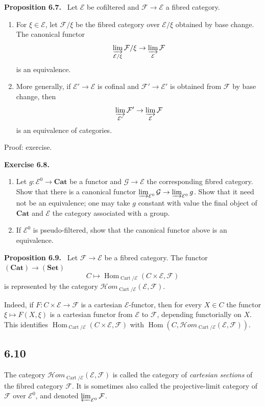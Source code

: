 \documentclass[11pt]{article}
\newcommand{\E}{\mathcal{E}}
\newcommand{\F}{\mathcal{F}}
\newcommand{\G}{\mathcal{G}}
\newcommand{\Ens}{\mathbf{Set}}
\newcommand{\Cat}{\mathbf{Cat}}
\newcommand{\Hom}{\operatorname{Hom}}
\newcommand{\Cart}{\operatorname{Cart}}
\newenvironment{statement}[1]{\par\medskip\noindent\textbf{#1.}\ }{\par\medskip}
\newenvironment{remarktext}[1]{\par\medskip\noindent\textbf{#1.}\ }{\par\medskip}
\begin{document}
\begin{statement}{Proposition 6.7}
Let \(\E\) be cofiltered and \(\F\to\E\) a fibred category.
\begin{enumerate}[label=\arabic*)]
\item For \(\xi\in\E\), let \(\F/\xi\) be the fibred category over \(\E/\xi\) obtained by base change. The canonical functor
\[
 \varinjlim_{\E/\xi}\F/\xi\to\varinjlim_{\E}\F
\]
is an equivalence.
\item More generally, if \(\E'\to\E\) is cofinal and \(\F'\to\E'\) is obtained from \(\F\) by base change, then
\[
 \varinjlim_{\E'}\F'\to\varinjlim_{\E}\F
\]
is an equivalence of categories.
\end{enumerate}
\end{statement}

Proof: exercise.

\begin{remarktext}{Exercise 6.8}
\begin{enumerate}[label=\arabic*)]
\item Let \(g:\E^0\to\Cat\) be a functor and \(\G\to\E\) the corresponding fibred category. Show that there is a canonical functor \(\varinjlim_{\E^0}\G\to\varinjlim_{\E^0}g\). Show that it need not be an equivalence; one may take \(g\) constant with value the final object of \(\Cat\) and \(\E\) the category associated with a group.
\item If \(\E^0\) is pseudo-filtered, show that the canonical functor above is an equivalence.
\end{enumerate}
\end{remarktext}

\begin{statement}{Proposition 6.9}
Let \(\F\to\E\) be a fibred category. The functor \((\Cat)\to(\Ens)\)
\[
 C\longmapsto \Hom_{\Cart/\E}(C\times\E,\F)
\]
is represented by the category \(\mathcal{H}om_{\Cart/\E}(\E,\F)\).
\end{statement}

Indeed, if \(F:C\times\E\to\F\) is a cartesian \(\E\)-functor, then for every \(X\in C\) the functor \(\xi\mapsto F(X,\xi)\) is a cartesian functor from \(\E\) to \(\F\), depending functorially on \(X\). This identifies \(\Hom_{\Cart/\E}(C\times\E,\F)\) with \(\Hom(C,\mathcal{H}om_{\Cart/\E}(\E,\F))\).

\subsection*{6.10}
The category \(\mathcal{H}om_{\Cart/\E}(\E,\F)\) is called the category of \emph{cartesian sections} of the fibred category \(\F\). It is sometimes also called the projective-limit category of \(\F\) over \(\E^0\), and denoted \(\varprojlim_{\E^0}\F\).
\end{document}
